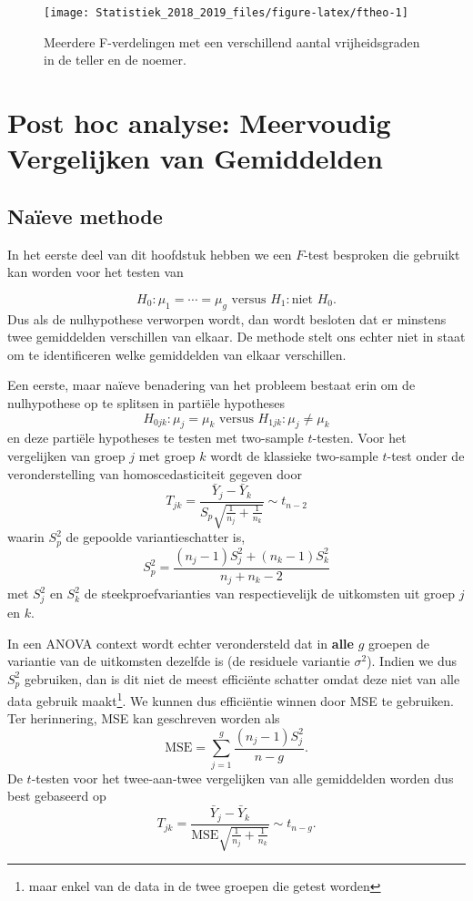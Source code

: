 \documentclass[12pt,dutch,coursenotes]{book}
\let\rmarkdownfootnote\footnote%
\def\footnote{\protect\rmarkdownfootnote}
\theoremstyle{definition}
\theoremstyle{definition}
\theoremstyle{definition}
\theoremstyle{remark}
\begin{document}
\begin{figure}

{\centering \texttt{[image: Statistiek\_2018\_2019\_files/figure-latex/ftheo-1]} 

}

\caption{Meerdere F-verdelingen met een verschillend aantal vrijheidsgraden in de teller en de noemer.}\label{fig:ftheo}
\end{figure}

\section{Post hoc analyse: Meervoudig Vergelijken van
Gemiddelden}\label{post-hoc-analyse-meervoudig-vergelijken-van-gemiddelden}

\subsection{Naïeve methode}\label{naieve-methode}

In het eerste deel van dit hoofdstuk hebben we een \(F\)-test besproken
die gebruikt kan worden voor het testen van

\[  H_0: \mu_1=\cdots = \mu_g \text{ versus } H_1: \text{niet } H_0.\]
Dus als de nulhypothese verworpen wordt, dan wordt besloten dat er
minstens twee gemiddelden verschillen van elkaar. De methode stelt ons
echter niet in staat om te identificeren welke gemiddelden van elkaar
verschillen.

Een eerste, maar naïeve benadering van het probleem bestaat erin om de
nulhypothese op te splitsen in partiële hypotheses
\[H_{0jk}: \mu_j=\mu_k \text{ versus } H_{1jk}: \mu_j \neq \mu_k\] en
deze partiële hypotheses te testen met two-sample \(t\)-testen. Voor het
vergelijken van groep \(j\) met groep \(k\) wordt de klassieke
two-sample \(t\)-test onder de veronderstelling van homoscedasticiteit
gegeven door
\[T_{jk} = \frac{\bar{Y}_j-\bar{Y}_k}{S_p\sqrt{\frac{1}{n_j}+\frac{1}{n_k}}} \sim t_{n-2}\]
waarin \(S_p^2\) de gepoolde variantieschatter is,
\[S_p^2 = \frac{(n_j-1)S_j^2 + (n_k-1)S_k^2}{n_j+n_k-2}\] met \(S_j^2\)
en \(S_k^2\) de steekproefvarianties van respectievelijk de uitkomsten
uit groep \(j\) en \(k\).

In een ANOVA context wordt echter verondersteld dat in \textbf{alle}
\(g\) groepen de variantie van de uitkomsten dezelfde is (de residuele
variantie \(\sigma^2\)). Indien we dus \(S_p^2\) gebruiken, dan is dit
niet de meest efficiënte schatter omdat deze niet van alle data gebruik
maakt\footnote{maar enkel van de data in de twee groepen die getest
  worden}. We kunnen dus efficiëntie winnen door MSE te gebruiken. Ter
herinnering, MSE kan geschreven worden als
\[\text{MSE}= \sum_{j=1}^g \frac{(n_j-1)S_j^2}{n-g}.\] De \(t\)-testen
voor het twee-aan-twee vergelijken van alle gemiddelden worden dus best
gebaseerd op
\[T_{jk} = \frac{\bar{Y}_j-\bar{Y}_k}{\text{MSE}\sqrt{\frac{1}{n_j}+\frac{1}{n_k}}} \sim t_{n-g}.\]
\end{document}
